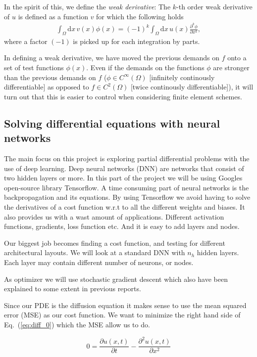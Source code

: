 \documentclass[a4paper, twocolumn]{article}
\newcommand{\eq} [1]{Eq.\ (\ref{eq:#1})}
\begin{document}
In the spirit of this, we define the \textit{weak derivative}: The $k$-th order weak derivative of $u$ is defined as a function $v$ for which the following holds
\begin{align}
\int_\Omega \mathrm{d}x\, v(x)\phi(x) = (-1)^k \int_\Omega\mathrm{d}x\, u(x)\frac{\partial^k \phi}{\partial x^k},
\end{align}
where a factor $(-1)$ is picked up for each integration by parts. 

In defining a weak derivative, we have moved the previous demands on $f$ onto a set of test functions $\phi(x)$. Even if the demands on the functions $\phi$ are stronger than the previous demands on $f$ ($\phi\in C^\infty(\Omega)$ [infinitely continously differentiable] as opposed to $f\in C^2(\Omega)$ [twice continously differentiable]), it will turn out that this is easier to control when considering finite element schemes. 




\subsection{Solving differential equations with neural networks}
The main focus on this project is exploring partial differential problems with the use of deep learning. Deep neural networks (DNN) are networks that consist of two hidden layers or more. In this part of the project we will be using Googles open-source library Tensorflow. A time consuming part of neural networks is the backpropagation and its equations. By using Tensorflow we avoid having to solve the derivatives of a cost function w.r.t to all the different weights and biases. It also provides us with a wast amount of applications. Different activation functions, gradients, loss function etc. And it is easy to add layers and nodes. 

Our biggest job becomes finding a cost function, and testing for different architectural layouts. We will look at a standard DNN with $n_h$ hidden layers. Each layer may contain different number of neurons, or nodes. 

As optimizer we will use stochastic gradient descent which also have been explained to some extent in previous reports. 

Since our PDE is the diffusion equation it makes sense to use the mean squared error (MSE) as our cost function. We want to minimize the right hand side of \eq{diff_0} which the MSE allow us to do. 

\begin{equation} \label{eq:diff_0}
0 = \frac{\partial u(x,t)}{\partial t} - \frac{\partial^2 u(x,t)}{\partial x^2} 
\end{equation}
\end{document}
